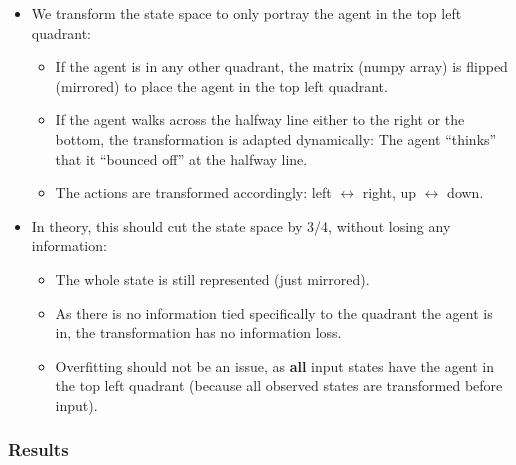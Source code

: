 \documentclass{article} %
\begin{document}
	\begin{itemize}
		\item We transform the state space to only portray the agent in the top left quadrant:
		\begin{itemize}
			\item If the agent is in any other quadrant, the matrix (numpy array) is flipped (mirrored) to place the agent in the top left quadrant.
			\item If the agent walks across the halfway line either to the right or the bottom, the transformation is adapted dynamically: The agent ``thinks'' that it ``bounced off'' at the halfway line.
			\item The actions are transformed accordingly: left $\leftrightarrow$ right, up $\leftrightarrow$ down.
		\end{itemize}
		\item In theory, this should cut the state space by 3/4, without losing any information:
		\begin{itemize}
			\item The whole state is still represented (just mirrored).
			\item As there is no information tied specifically to the quadrant the agent is in, the transformation has no information loss.
			\item Overfitting should not be an issue, as \textbf{all} input states have the agent in the top left quadrant (because all observed states are transformed before input).
		\end{itemize}
	\end{itemize}
	
	\subsubsection{Results}
	
\end{document}
